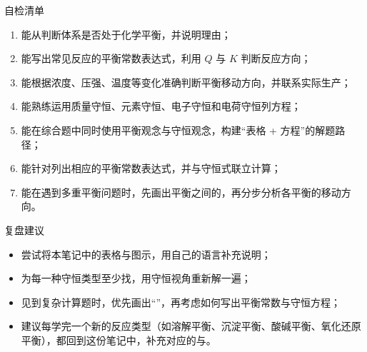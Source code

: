 \documentclass[a4paper,11pt]{ctexart}
\begin{document}
\begin{summarybox}{自检清单}
  \begin{enumerate}
    \item 能从判断体系是否处于化学平衡，并说明理由；
    \item 能写出常见反应的平衡常数表达式，利用 $Q$ 与 $K$ 判断反应方向；
    \item 能根据浓度、压强、温度等变化准确判断平衡移动方向，并联系实际生产；
    \item 能熟练运用质量守恒、元素守恒、电子守恒和电荷守恒列方程；
    \item 能在综合题中同时使用平衡观念与守恒观念，构建“表格 + 方程”的解题路径；
    \item 能针对列出相应的平衡常数表达式，并与守恒式联立计算；
    \item 能在遇到多重平衡问题时，先画出平衡之间的，再分步分析各平衡的移动方向。
  \end{enumerate}
\end{summarybox}

\begin{notebox}{复盘建议}
  \begin{itemize}
    \item 尝试将本笔记中的表格与图示，用自己的语言补充说明；
    \item 为每一种守恒类型至少找，用守恒视角重新解一遍；
    \item 见到复杂计算题时，优先画出“”，再考虑如何写出平衡常数与守恒方程；
    \item 建议每学完一个新的反应类型（如溶解平衡、沉淀平衡、酸碱平衡、氧化还原平衡），都回到这份笔记中，补充对应的与。
  \end{itemize}
\end{notebox}
\end{document}
